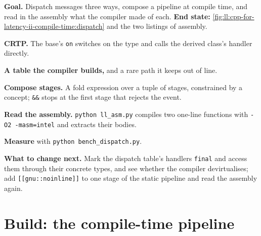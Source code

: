 \begin{tutorial}
\textbf{Goal.} Dispatch messages three ways, compose a pipeline at compile time, and read in the assembly what the compiler
made of each. \textbf{End state:} \cref{fig:ll:cpp-for-latency-ii-compile-time:dispatch} and the two listings of assembly.
\begin{tutsteps}
\item \textbf{CRTP.} The base's \texttt{on} switches on the type and calls the derived class's handler directly.
\label{lst:ll:cpp-for-latency-ii-compile-time:crtp}
\item \textbf{A table the compiler builds,} and a rare path it keeps out of line.
\label{lst:ll:cpp-for-latency-ii-compile-time:consteval}
\item \textbf{Compose stages.} A fold expression over a tuple of stages, constrained by a concept; \texttt{\&\&} stops at
the first stage that rejects the event.
\label{lst:ll:cpp-for-latency-ii-compile-time:pipeline}
\item \textbf{Read the assembly.} \texttt{python ll\_asm.py} compiles two one-line functions with \texttt{-O2
-masm=intel} and extracts their bodies.
\label{lst:ll:cpp-for-latency-ii-compile-time:asm-static}
\label{lst:ll:cpp-for-latency-ii-compile-time:asm-dyn}
\item \textbf{Measure} with \texttt{python bench\_dispatch.py}.
\end{tutsteps}
\textbf{What to change next.} Mark the dispatch table's handlers \texttt{final} and access them through their concrete types,
and see whether the compiler devirtualises; add \texttt{[[gnu::noinline]]} to one stage of the static pipeline and read the
assembly again.
\end{tutorial}

\section{Build: the compile-time pipeline}\label{bld:ll:cpp-for-latency-ii-compile-time:pipeline}

